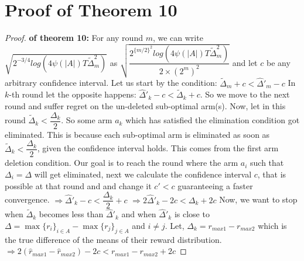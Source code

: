 \section{Proof of Theorem 10}

\begin{proof}\textbf{ of theorem 10:}
For any round $m$, we can write $\sqrt{2^{-3/4} log({4\psi(|A|)T\tilde{\Delta}_{m}^{2}})}$ as $\sqrt{\dfrac{2^{\lbrace m/2 \rbrace^{2}} log({4\psi(|A|)T\tilde{\Delta}_{m}^{2}})}{2\times(2^{m})^2}}$ and let $c$ be any arbitrary confidence interval.
Let us start by the condition: 
\newline
\hspace*{8em}$\tilde{\Delta}_{m} + c < \hat{\Delta}'_{m} - c$
\newline
In $k$-th round let the opposite happens:
\newline
\hspace*{8em}$\hat{\Delta}'_{k} - c < \tilde{\Delta}_{k} + c$.
\newline
So we move to the next round and suffer regret on the un-deleted sub-optimal arm(s).
Now, let in this round $\tilde{\Delta}_{k} < \dfrac{\Delta_{k}}{2}$. So some arm $a_{k}$ which has satisfied the elimination condition got eliminated. This is because each sub-optimal arm is eliminated as soon as $\tilde{\Delta}_{k} < \dfrac{\Delta_{k}}{2}$, given the confidence interval holds. This comes from the first arm deletion condition. Our goal is to reach the round where the arm $a_{i}$ such that $\Delta_{i}=\Delta$ will get eliminated, next we calculate the confidence interval $c$, that is possible at that round and and change it $c' < c$ guaranteeing a faster convergence. %
\newline
\hspace*{8em}$\Rightarrow \hat{\Delta}'_{k} - c < \dfrac{\Delta_{k}}{2} + c$
\newline
\hspace*{8em}$\Rightarrow 2\hat{\Delta}'_{k} - 2c < \Delta_{k} + 2c$
\newline
Now, we want to stop when $\tilde{\Delta}_{k}$ becomes less than $\hat{\Delta}'_{k}$ and when  $\hat{\Delta}'_{k}$ is close to $\Delta=\max\lbrace r_{i}\rbrace_{i\in A} - \max\lbrace r_{j}\rbrace_{j\in A}$ and $i\neq j$.
\newline
Let, $\Delta_{k}=r_{max1}-r_{max2}$ which is the true difference of the means of their reward distribution.
\newline
\hspace*{8em}$\Rightarrow 2(\hat{r}_{max1}-\hat{r}_{max2}) - 2c < r_{max1}-r_{max2} + 2c$

\end{proof}
